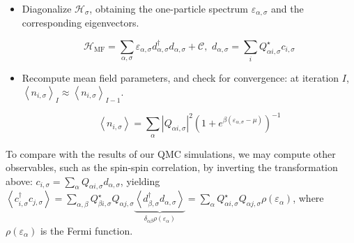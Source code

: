 \begin{itemize}
\item Diagonalize $\mathcal{H}_\sigma$, obtaining the one-particle spectrum $\varepsilon_{\alpha, \sigma}$ and the corresponding eigenvectors.

\begin{equation}
\mathcal{H}_{\text{MF}} = \sum_{\alpha, \sigma} \varepsilon_{\alpha, \sigma} d_{\alpha, \sigma}^\dagger d_{\alpha, \sigma} + \mathcal{C} , \,\, d_{\alpha, \sigma} = \sum_i Q_{\alpha i, \sigma}^\star c_{i,\sigma}
\end{equation}

\item Recompute mean field parameters, and check for convergence: at iteration $I$, $\left\langle n_{i,\sigma} \right\rangle_I \approx \left\langle n_{i,\sigma} \right\rangle_{I - 1}$.

\begin{equation}\label{eq:selfConsistent}
\left\langle n_{i,\sigma} \right\rangle = \sum_\alpha | Q_{\alpha i, \sigma} |^2 ( 1 + e^ { \beta ( \varepsilon_{\alpha, \sigma} - \mu )} )^{-1}
\end{equation}

\end{itemize}

To compare with the results of our \ac{QMC} simulations, we may compute other observables, such as the spin-spin correlation, by inverting the transformation above: $c_{i, \sigma} = \sum_{\alpha} Q_{\alpha i, \sigma} d_{\alpha, \sigma}$, yielding $\left\langle c_{i,\sigma}^\dagger c_{j,\sigma} \right\rangle = \sum_{\alpha, \beta} Q_{\beta i, \sigma}^\star Q_{\alpha j, \sigma} \underbrace{\left\langle d_{\beta,\sigma}^\dagger d_{\alpha,\sigma} \right\rangle}_{\delta_{\alpha\beta} \rho (\varepsilon_\alpha)} = \sum_\alpha Q_{\alpha i, \sigma}^\star Q_{\alpha j, \sigma} \rho ( \varepsilon_\alpha ) $, where $\rho (\varepsilon_\alpha)$ is the Fermi function.

